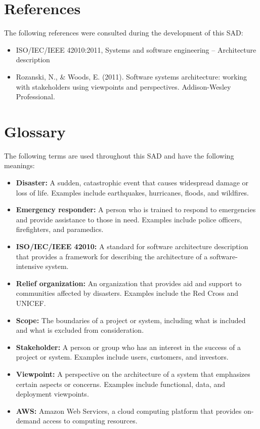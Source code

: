 \documentclass[a4paper]{article}
\begin{document}
    \section{References}
    The following references were consulted during the development of this SAD:
    \begin{itemize}
        \item ISO/IEC/IEEE 42010:2011, Systems and software engineering -- Architecture description
        \item Rozanski, N., \& Woods, E. (2011). Software systems architecture: working with stakeholders using viewpoints and 
        perspectives. Addison-Wesley Professional.
    \end{itemize}

    \section{Glossary}
    The following terms are used throughout this SAD and have the following meanings:
    \begin{itemize}
        \item \textbf{Disaster:} A sudden, catastrophic event that causes widespread damage or loss of life. Examples include 
        earthquakes, hurricanes, floods, and wildfires.
        \item \textbf{Emergency responder:} A person who is trained to respond to emergencies and provide assistance to 
        those in need. Examples include police officers, firefighters, and paramedics.
        \item \textbf{ISO/IEC/IEEE 42010:} A standard for software architecture description that provides a framework for 
        describing the architecture of a software-intensive system.
        \item \textbf{Relief organization:} An organization that provides aid and support to communities affected by disasters. 
        Examples include the Red Cross and UNICEF.
        \item \textbf{Scope:} The boundaries of a project or system, including what is included and what is excluded from
        consideration.
        \item \textbf{Stakeholder:} A person or group who has an interest in the success of a project or system. Examples include
        users, customers, and investors.
        \item \textbf{Viewpoint:} A perspective on the architecture of a system that emphasizes certain aspects or concerns.
        Examples include functional, data, and deployment viewpoints.
        \item \textbf{AWS:} Amazon Web Services, a cloud computing platform that provides on-demand access to computing resources.
    \end{itemize}
\end{document}
